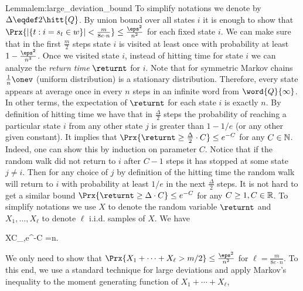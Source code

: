 \iffalse
\begin{lemma}
	\label{lem:hitting-vs-mixing}
	For a symmetric Markov chain $M$ on a discrete state space of size $n$, 
	$$\hitt{M} \le \mixt{M}n.$$
\end{lemma}
\begin{proof}
	
\end{proof}
\fi


\begin{prevproof}{Lemma}{lem:large_deviation_bound}
	To simplify notations we denote by $\Delta\eqdef 2\hitt{Q}$. By union bound over all states $i$ it is enough to show that $\Prx{|\{t: i=s_t\in w\}|<\frac{m}{8e\cdot n}}\le\frac{\eps^2}{n^2}$ 
	for each fixed state $i$. We can make sure that in the first $\frac{m}{2}$ steps state $i$ is visited at least once with probability 
	at least $1-\frac{\eps^2}{n^3}$. Once we visited state $i$, instead of hitting time for state $i$ we can analyze the {\em return time} $\returnt$ for $i$.
	Note that for symmetric Markov chains $\frac{1}{n}\onev$ (uniform distribution) is a stationary distribution. Therefore, every state appears at average once 
	in every $n$ steps in an infinite word from $\word{Q}{\infty}$. In other terms, the expectation of $\returnt$ for each 
	state $i$ is exactly $n$. By definition of hitting time we have that in $\frac{\Delta}{2}$ steps the probability 
	of reaching a particular state $i$ from any other state $j$ is greater than $1-1/e$ (or any other given constant). It implies that $\Prx{\returnt \ge \frac{\Delta}{2}\cdot C}\le e^{-C}$
	for any $C\in\mathbb{N}$. Indeed, one can show this by induction on parameter $C$. 
	Notice that if the random walk did not return to $i$ after $C-1$ steps it has stopped at some state $j\neq i$. Then for any choice of $j$ by definition of the hitting time 
	the random walk will return to $i$ with probability at least $1/e$ in the next $\frac{\Delta}{2}$ steps. It is not hard to get a similar bound $\Prx{\returnt \ge \Delta\cdot C}\le e^{-C}$ for any $C\ge 1, C\in\mathbb{R}$. To simplify notations we use $X$ to denote the random variable $\returnt$ 
	and $X_1,\dots,X_\ell$ to denote $\ell$ i.i.d. samples of $X$. We have  
	
	\be
	X\quad{}\quad\forall C\in\R_{},\le e^{-C} \quad{}\quad {}=n.
	\label{eq:ineq_return}
	\ee
	
	We only need to show that $\Prx{X_1+\cdots+X_\ell > m/2} \le \frac{\eps^2}{n^2}$ for $\ell=\frac{m}{8e\cdot n}$.
	To this end, we use a standard technique for large deviations and apply Markov's inequality to the moment generating function of $X_1 + \cdots + X_\ell$,
	

\end{prevproof}
